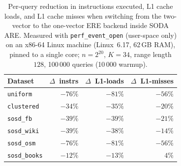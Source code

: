 \begin{table}[H]
    \centering
    \setlength{\tabcolsep}{6pt}
    \small
    \begin{tabular}{@{}lrrr@{}}
        \toprule
        Dataset & $\Delta$~instrs & $\Delta$~L1-loads & $\Delta$~L1-misses \\
        \midrule
        \texttt{uniform}     & $-76\%$ & $-81\%$ & $-56\%$ \\
        \texttt{clustered}   & $-34\%$ & $-35\%$ & $-20\%$ \\
        \texttt{sosd\_fb}    & $-39\%$ & $-39\%$ & $-21\%$ \\
        \texttt{sosd\_wiki}  & $-39\%$ & $-38\%$ & $-14\%$ \\
        \texttt{sosd\_osm}   & $-76\%$ & $-81\%$ & $-56\%$ \\
        \texttt{sosd\_books} & $-12\%$ & $-13\%$ & $\phantom{-}4\%$  \\
        \bottomrule
    \end{tabular}
    \caption{Per-query reduction in instructions executed, L1 cache loads,
        and L1 cache misses when switching from the two-vector to the
        one-vector ERE backend inside SODA ARE. Measured with
        \texttt{perf\_event\_open} (user-space only) on an x86-64 Linux
        machine (Linux~6.17, 62\,GB RAM), pinned to a single core;
        $n = 2^{20}$, $K = 34$, range length $128$,
        100\,000 queries (10\,000 warmup).}
    \label{tab:ere-backend-pmu}
\end{table}

